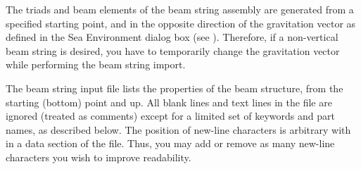 The triads and beam elements of the beam string assembly are generated from a
specified starting point, and in the opposite direction of the gravitation
vector as defined in the Sea Environment dialog box (see
).
Therefore, if a non-vertical beam string is desired, you have to temporarily
change the gravitation vector while performing the beam string import.



The beam string input file lists the properties of the beam structure, from the
starting (bottom) point and up. All blank lines and text lines in the file are
ignored (treated as comments) except for a limited set of keywords and part
names, as described below. The position of new-line characters is arbitrary with
in a data section of the file. Thus, you may add or remove as many new-line
characters you wish to improve readability.

